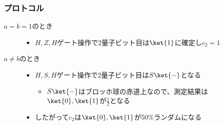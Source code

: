 \begin{frame}
  \frametitle{プロトコル}

  \begin{description}
    \item[$a = b = 1$のとき]\mbox{}
    \begin{figure}
    \end{figure}
    \begin{itemize}
      \item $H,Z,H$ゲート操作で2量子ビット目は$\ket{1}$に確定し$c_2 = 1$
    \end{itemize}

    \item[$a \ne b$のとき]\mbox{}
    \begin{figure}
    \end{figure}
    \begin{itemize}
      \item $H,S,H$ゲート操作で2量子ビット目は$S\ket{-}$となる
      \begin{itemize}
        \item $S\ket{-}$はブロッホ球の赤道上なので、測定結果は$\ket{0}, \ket{1}$が$\frac{1}{2}$となる
      \end{itemize}

      \item したがって$c_2$は$\ket{0}, \ket{1}$が50\%ランダムになる
    \end{itemize}
  \end{description}
\end{frame}

